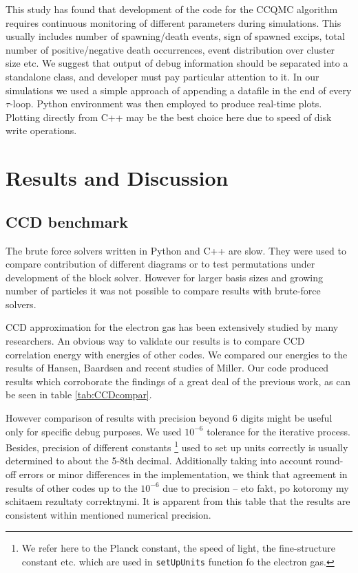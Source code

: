 \documentclass[twoside,english]{uiofysmaster}
\newcommand{\classname}[1]{\texttt{#1}}
\begin{document}
This study has found that development of the code for the CCQMC algorithm requires continuous monitoring of different parameters during simulations. This usually includes number of spawning/death events, sign of spawned excips, total number of positive/negative death occurrences, event distribution over cluster size etc.
We suggest that output of debug information should be separated into a standalone class, and developer must pay particular attention to it. In our simulations we used a simple approach of appending a datafile in the end of every $\tau$-loop. Python environment was then employed to produce real-time plots. Plotting directly from C++ may be the best choice here due to speed of disk write operations.  

\chapter{Results and Discussion}






\section{CCD benchmark}

The brute force solvers written in Python and C++ are slow. They were used to compare contribution of different diagrams or to test permutations under development of the block solver. However for larger basis sizes and growing number of particles it was not possible to compare results with brute-force solvers.

CCD approximation for the electron gas has been extensively studied by many researchers. An obvious way to validate our results is to compare CCD correlation energy with energies of other codes. We compared our energies to the results of Hansen\cite{HansenCoupledclusterstudies},  Baardsen \cite{BaardsenCoupledclustertheoryinfinite2014} and recent studies of Miller\cite{MillerQuantumMechanicalStudies2017}. Our code produced results which corroborate the findings of a great deal of the previous work, as can be seen in table \ref{tab:CCDcompar}.




However comparison of results with precision beyond 6 digits might be useful only for specific debug purposes. We used $10^{-6}$ tolerance for the iterative process. Besides, precision of different constants \footnote{We refer here to the Planck constant, the speed of light, the fine-structure constant etc. which are used in \classname{setUpUnits} function fo the electron gas.} used to set up units correctly is usually determined to about the 5-8th decimal. Additionally taking into account round-off errors or minor differences in the implementation, we think that agreement in results of other codes up to the $10^{-6}$ due to precision -- eto fakt, po kotoromy my schitaem rezultaty correktnymi.
It is apparent from this table that the results are consistent within mentioned numerical precision.
\end{document}
